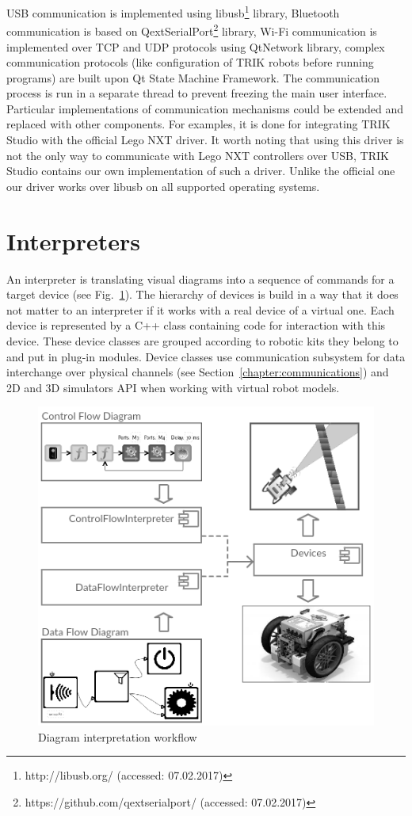 \documentclass[conference]{IEEEtran}
\begin{document}
USB communication is implemented using libusb\footnote{http://libusb.org/ (accessed: 07.02.2017)} library, Bluetooth communication is based on QextSerialPort\footnote{https://github.com/qextserialport/ (accessed: 07.02.2017)} library, Wi-Fi communication is implemented over TCP and UDP protocols using QtNetwork library, complex communication protocols (like configuration of TRIK robots before running programs) are built upon Qt State Machine Framework. The communication process is run in a separate thread to prevent freezing the main user interface. Particular implementations of communication mechanisms could be extended and replaced with other components. For examples, it is done for integrating TRIK Studio with the official Lego NXT driver. It worth noting that using this driver is not the only way to communicate with Lego NXT controllers over USB, TRIK Studio contains our own implementation of such a driver. Unlike the official one our driver works over libusb on all supported operating systems.

\section{Interpreters}
\label{chapter:interpreters}

An interpreter is translating visual diagrams into a sequence of commands for a target device (see Fig.~\ref{image:interpretersTSArch}). The hierarchy of devices is build in a way that it does not matter to an interpreter if it works with a real device of a virtual one. Each device is represented by a C++ class containing code for interaction with this device. These device classes are grouped according to robotic kits they belong to and put in plug-in modules. Device classes use communication subsystem for data interchange over physical channels (see Section~\ref{chapter:communications}) and 2D and 3D simulators API when working with virtual robot models. 

\begin{figure}[ht]
    \centering
    \includegraphics[width=0.9\columnwidth]{TS_Interpreter_Architecture.png}
    \caption{Diagram interpretation workflow}
    \label{image:interpretersTSArch}
\end{figure}
\end{document}
